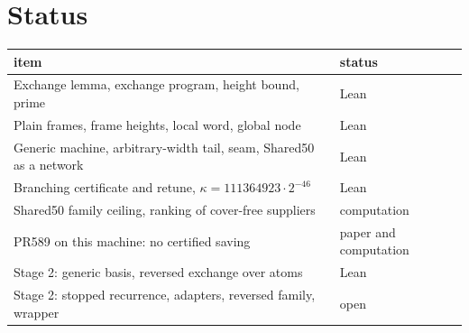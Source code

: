 \documentclass[11pt]{amsart}
\theoremstyle{remark}
\begin{document}
\section{Status}

\begin{center}
\small
\begin{tabularx}{\textwidth}{@{}Xl@{}}
\toprule
item & status\\
\midrule
Exchange lemma, exchange program, height bound, prime & Lean\\
Plain frames, frame heights, local word, global node & Lean\\
Generic machine, arbitrary-width tail, seam, Shared50 as a network & Lean\\
Branching certificate and retune, $\kappa = 111364923 \cdot 2^{-46}$ & Lean\\
Shared50 family ceiling, ranking of cover-free suppliers & computation\\
PR589 on this machine: no certified saving & paper and computation\\
Stage 2: generic basis, reversed exchange over atoms & Lean\\
Stage 2: stopped recurrence, adapters, reversed family, wrapper & open\\
\bottomrule
\end{tabularx}
\end{center}
\end{document}

